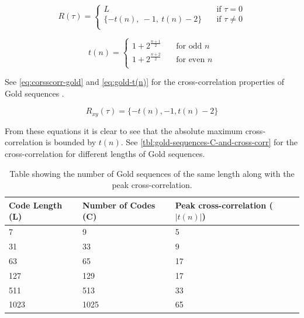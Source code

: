 \begin{equation}
	\label{eq:autocorr-gold}
	R(\tau) = 
		\begin{cases}
			L    							& \quad \text{if } \tau = 0 \\
			\{ -t(n), \ -1, \ t(n) - 2  \} 	& \quad \text{if } \tau \neq 0 \\
		\end{cases}
\end{equation}

\begin{equation}
	\label{eq:gold-t(n)}
	t(n) = 
		\begin{cases}
			1 + 2^{\frac{n+1}{2}} & \quad \text{for odd } n \\
			1 + 2^{\frac{n+2}{2}} & \quad \text{for even } n \\
		\end{cases}
\end{equation}

See \autoref{eq:corsscorr-gold} and \autoref{eq:gold-t(n)} for the cross-correlation properties of Gold sequences \cite{mitra2008pseudo}.

\begin{equation}
	\label{eq:corsscorr-gold}
	R_{xy}(\tau) = 	\{ -t(n), -1, t(n) - 2  \} 
\end{equation}


From these equations it is clear to see that the absolute maximum cross-correlation is bounded by $t(n)$.
See \autoref{tbl:gold-sequences-C-and-cross-corr} for the cross-correlation for different lengths of Gold sequences.


\begin{table}[tbp]
	\centering
	\begin{tabular}{  | l | l | l | }

		\hline
		Code Length (L)	& Number of Codes (C) 	& Peak cross-correlation ($|t(n)|$)	\\ \hline
		
		7				& 9						& 5						\\ \hline					
		31				& 33					& 9						\\ \hline			
		63				& 65					& 17					\\ \hline			
		127				& 129					& 17					\\ \hline	
		511				& 513					& 33					\\ \hline	
		1023			& 1025					& 65					\\ \hline	

	\end{tabular}
	\caption{Table showing the number of Gold sequences of the same length along with the peak cross-correlation. }
	\label{tbl:gold-sequences-C-and-cross-corr}

\end{table}

